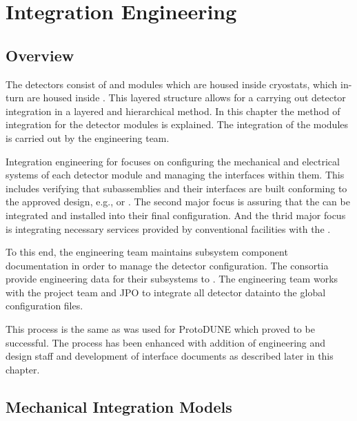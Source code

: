 \chapter{Integration Engineering}
\label{sec:fdsp-coord-integ-sysengr}

\section{Overview}
\label{sec:fdsp-overview}

The  detectors consist of  and 
modules which are housed inside cryostats, which in-turn are housed
inside . This layered structure allows for a carrying out
detector integration in a layered and hierarchical method. In this
chapter the method of integration for the detector modules is
explained.  The integration of the modules is carried out by the
 engineering team.

Integration engineering for  focuses on configuring the
mechanical and electrical systems of each detector module and managing
the interfaces within them. This includes verifying that subassemblies
and their interfaces are built conforming to the approved design,
e.g.,  or  . The second major focus
is assuring that the  can be integrated and
installed into their final configuration. And the thrid major focus is
integrating necessary services provided by conventional facilities
with the .


To this end, the  engineering team maintains subsystem
component documentation in order to manage the detector
configuration. The consortia provide engineering data for their
subsystems to . The  engineering team works with
the  project team and JPO to integrate all detector
datainto the global  configuration files.

This process is the same as was used for ProtoDUNE which proved to be
successful. The process has been enhanced with addition of engineering
and design staff and development of interface documents as described
later in this chapter.

\section{Mechanical Integration Models}
\label{sec:fdsp-coord-integ-models}

